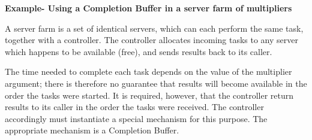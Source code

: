 {\bf Example- Using a Completion Buffer in a server farm of multipliers}

A server farm is a set of identical servers, which can each perform the same
task, together with a controller.  The controller allocates incoming tasks to
any server which happens to be available (free), and sends results back to its
caller.  

The time needed to complete each task depends on the
value of the multiplier argument; there is therefore no guarantee that results
will become available in the order the tasks were started.  It is required,
however, that the controller return results to its caller in the order the
tasks were received.  The controller accordingly must instantiate a special
mechanism for this purpose.  The appropriate mechanism is a Completion Buffer.

